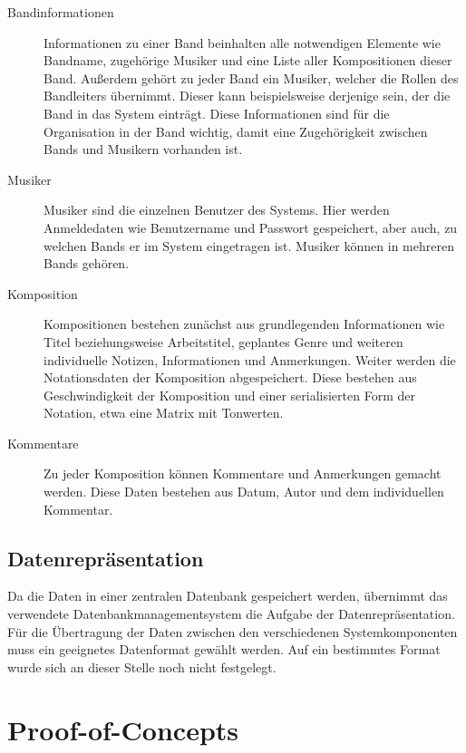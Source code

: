 \documentclass[12pt]{scrartcl}
\begin{document}
\begin{description}
\item[Bandinformationen]
Informationen zu einer Band beinhalten alle notwendigen Elemente wie Bandname, zugehörige Musiker und eine Liste aller Kompositionen dieser Band. Außerdem gehört zu jeder Band ein Musiker, welcher die Rollen des Bandleiters übernimmt. Dieser kann beispielsweise derjenige sein, der die Band in das System einträgt. Diese Informationen sind für die Organisation in der Band wichtig, damit eine Zugehörigkeit zwischen Bands und Musikern vorhanden ist.
\item[Musiker]
Musiker sind die einzelnen Benutzer des Systems. Hier werden Anmeldedaten wie Benutzername und Passwort gespeichert, aber auch, zu welchen Bands er im System eingetragen ist. Musiker können in mehreren Bands gehören.
\item[Komposition]
Kompositionen bestehen zunächst aus grundlegenden Informationen wie Titel beziehungsweise Arbeitstitel, geplantes Genre und weiteren individuelle Notizen, Informationen und Anmerkungen. Weiter werden die Notationsdaten der Komposition abgespeichert. Diese bestehen aus Geschwindigkeit der Komposition und einer serialisierten Form der Notation, etwa eine Matrix mit Tonwerten.
\item[Kommentare]
Zu jeder Komposition können Kommentare und Anmerkungen gemacht werden. Diese Daten bestehen aus Datum, Autor und dem individuellen Kommentar.
\end{description}

\subsection{Datenrepräsentation}
Da die Daten in einer zentralen Datenbank gespeichert werden, übernimmt das verwendete Datenbankmanagementsystem die Aufgabe der Datenrepräsentation. Für die Übertragung der Daten zwischen den verschiedenen Systemkomponenten muss ein geeignetes Datenformat gewählt werden. Auf ein bestimmtes Format wurde sich an dieser Stelle noch nicht festgelegt.


\section{Proof-of-Concepts}

\end{document}
